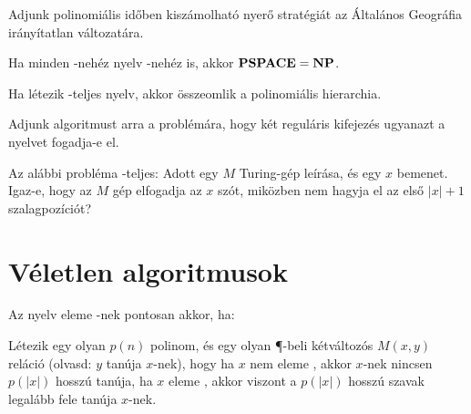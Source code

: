 \begin{Exercise}[counter={sorszam}, difficulty=2]
Adjunk polinomiális időben kiszámolható nyerő stratégiát az Általános Geográfia
irányítatlan változatára.

\end{Exercise}


\begin{Exercise}[counter={sorszam}, difficulty=0]
Ha minden \NP-nehéz nyelv \PSPACE-nehéz is, akkor $\mbox{\ensuremath{\mathbf{PSPACE}}}=\mbox{\ensuremath{\mathbf{NP}}}$.
\end{Exercise}


\begin{Exercise}[counter={sorszam}, difficulty=0]
\easy Ha létezik \PH-teljes nyelv, akkor összeomlik a polinomiális hierarchia.
\end{Exercise}



\begin{Exercise}[counter={sorszam}, difficulty=0]
Adjunk \PSPACE algoritmust arra a problémára, hogy két reguláris kifejezés ugyanazt
a nyelvet fogadja-e el. 
\end{Exercise}


\begin{Exercise}[counter={sorszam}, difficulty=0]
Az alábbi probléma \PSPACE-teljes: Adott egy $M$ Turing-gép leírása, és egy $x$ bemenet. Igaz-e, hogy az $M$ gép elfogadja az $x$ szót, miközben nem hagyja el az első $|x|+1$ szalagpozíciót?

\end{Exercise}



\chapter{Véletlen algoritmusok}

\begin{Exercise}[counter={sorszam}, difficulty=0]
Az \Language nyelv eleme \RP-nek pontosan akkor, ha:

Létezik egy olyan $p(n)$ polinom, és egy olyan \P-beli kétváltozós $M(x,y)$ reláció
(olvasd: $y$ tanúja $x$-nek), hogy ha $x$ nem eleme \Language, akkor $x$-nek nincsen $p(|x|)$
hosszú tanúja, ha $x$ eleme \Language, akkor viszont a $p(|x|)$ hosszú szavak legalább
fele tanúja $x$-nek.
\end{Exercise}


